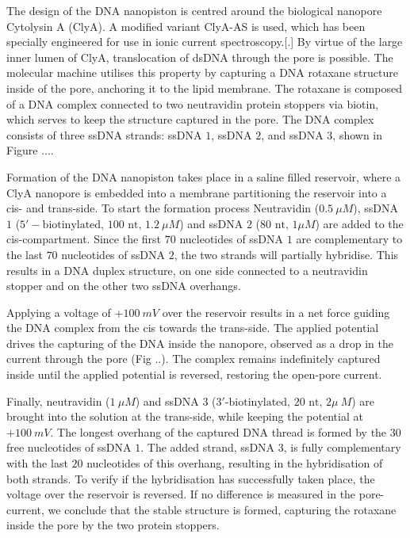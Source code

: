 The design of the DNA nanopiston is centred around the biological nanopore Cytolysin
A (ClyA). A modified variant ClyA-AS is used, which has been specially engineered for
use in ionic current spectroscopy.[.] By virtue of the large inner lumen of ClyA,
translocation of dsDNA through the pore is possible. The molecular machine utilises this
property by capturing a DNA rotaxane structure inside of the pore, anchoring it to the
lipid membrane. The rotaxane is composed of a DNA complex connected to two neutravidin
protein stoppers via biotin, which serves to keep the structure captured in the pore. The
DNA complex consists of three ssDNA strands: ssDNA $1$, ssDNA $2$, and ssDNA $3$, shown
in Figure ....

Formation of the DNA nanopiston takes place in a saline filled reservoir, where a
ClyA nanopore is embedded into a membrane partitioning the reservoir into a cis- and
trans-side. To start the formation process Neutravidin ($0.5\ \mu M$), ssDNA $1$
($5′-\text{biotinylated, }100\text{ nt, }1.2\ \mu M$) and ssDNA $2$ ($80\text{ nt, }1
\mu M$) are added to the cis-compartment. Since the first $70$ nucleotides of ssDNA $1$
are complementary to the last $70$ nucleotides of ssDNA $2$, the two strands will
partially hybridise. This results in a DNA duplex structure, on one side connected to a
neutravidin stopper and on the other two ssDNA overhangs.

Applying a voltage of $+100\ mV$ over the reservoir results in a net force guiding the
DNA complex from the cis towards the trans-side. The applied potential drives the
capturing of the DNA inside the nanopore, observed as a drop in the current through the
pore (Fig ..). The complex remains indefinitely captured inside until the
applied potential is reversed, restoring the open-pore current.

Finally, neutravidin ($1\ \mu M$) and ssDNA $3$ ($3\text{′-biotinylated, }20\text{ nt, }2
\mu\ M$) are brought into the solution at the trans-side, while keeping the potential at
$+ 100\ mV$. The longest overhang of the captured DNA thread is formed by the 30 free
nucleotides of ssDNA $1$. The added strand, ssDNA $3$, is fully complementary with the
last $20$ nucleotides of this overhang, resulting in the hybridisation of both strands.
To verify if the hybridisation has successfully taken place, the voltage over the
reservoir is reversed. If no difference is measured in the pore-current, we conclude that
the stable structure is formed, capturing the rotaxane inside the pore by the two protein
stoppers.

